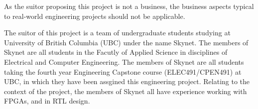 As the suitor proposing this project is not a business, the business aspects 
typical to real-world engineering projects should not be applicable.

The suitor of this project is a team of undergraduate students studying at 
University of British Columbia (UBC) under the name Skynet.
The members of Skynet are all students in the Facutly 
of Applied Science in disciplines of Electrical and Computer Engineering. 
The members of Skynet are all students taking the fourth year Engineering 
Capstone course (ELEC491/CPEN491) at UBC, in which they have been assgined 
this engineering project. Relating to the context of the 
project, the members of Skynet all have experience working with FPGAs, and in
RTL design.